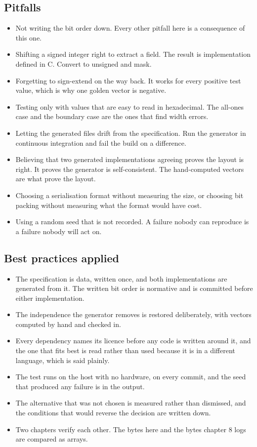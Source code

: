 \subsection*{Pitfalls}

\begin{itemize}
\item Not writing the bit order down. Every other pitfall here is a consequence
of this one.
\item Shifting a signed integer right to extract a field. The result is
implementation defined in C. Convert to unsigned and mask.
\item Forgetting to sign-extend on the way back. It works for every positive
test value, which is why one golden vector is negative.
\item Testing only with values that are easy to read in hexadecimal. The
all-ones case and the boundary case are the ones that find width errors.
\item Letting the generated files drift from the specification. Run the
generator in continuous integration and fail the build on a difference.
\item Believing that two generated implementations agreeing proves the layout is
right. It proves the generator is self-consistent. The hand-computed vectors are
what prove the layout.
\item Choosing a serialisation format without measuring the size, or choosing
bit packing without measuring what the format would have cost.
\item Using a random seed that is not recorded. A failure nobody can reproduce
is a failure nobody will act on.
\end{itemize}

\subsection*{Best practices applied}

\begin{itemize}
\item The specification is data, written once, and both implementations are
generated from it. The written bit order is normative and is committed before
either implementation.
\item The independence the generator removes is restored deliberately, with
vectors computed by hand and checked in.
\item Every dependency names its licence before any code is written around it,
and the one that fits best is read rather than used because it is in a different
language, which is said plainly.
\item The test runs on the host with no hardware, on every commit, and the seed
that produced any failure is in the output.
\item The alternative that was not chosen is measured rather than dismissed, and
the conditions that would reverse the decision are written down.
\item Two chapters verify each other. The bytes here and the bytes chapter 8
logs are compared as arrays.
\end{itemize}

